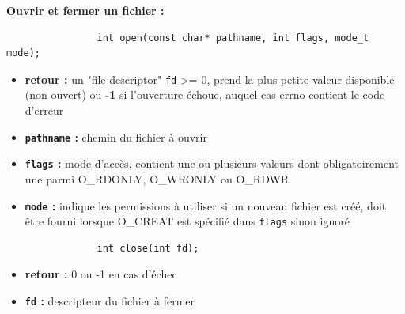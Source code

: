 		\begin{frame}[containsverbatim]
			\textbf{Ouvrir et fermer un fichier :}
			
			\begin{lstlisting}
				int open(const char* pathname, int flags, mode_t mode);
			\end{lstlisting}
			\begin{itemize}
				\item \textbf{retour :} un "file descriptor" \lstinline!fd! >= 0, prend la plus petite valeur disponible (non ouvert) ou \textbf{-1} si l'ouverture échoue, auquel cas errno contient le code d'erreur
				\item \textbf{\lstinline!pathname! :} chemin du fichier à ouvrir
				\item \textbf{\lstinline!flags! :} mode d'accès, contient une ou plusieurs valeurs dont obligatoirement une parmi O\_RDONLY, O\_WRONLY ou O\_RDWR
				\item \textbf{\lstinline!mode! :} indique les permissions à utiliser si un nouveau fichier est créé, doit être fourni lorsque O\_CREAT est spécifié dans \lstinline!flags! sinon ignoré
			\end{itemize}
			
			\begin{lstlisting}
				int close(int fd);
			\end{lstlisting}
			\begin{itemize}
				\item \textbf{retour :} 0 ou -1 en cas d'échec
				\item \textbf{\lstinline!fd! :} descripteur du fichier à fermer
			\end{itemize}
			
		\end{frame}	
		
